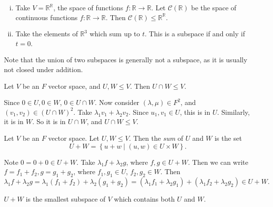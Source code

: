 \documentclass[12pt]{article}
\begin{document}
\begin{exbox}
	\begin{enumerate}[(i)]
		\item Take $V = \mathbb{R}^{\mathbb{R}}$, the space of functions $f : \mathbb{R} \to \mathbb{R}$. Let $\mathcal{C}(\mathbb{R})$ be the space of continuous functions $f : \mathbb{R} \to \mathbb{R}$. Then $\mathcal{C}(\mathbb{R}) \leq \mathbb{R}^{\mathbb{R}}$.
		\item Take the elements of $\mathbb{R}^3$ which sum up to $t$. This is a subspace if and only if $t = 0$.
	\end{enumerate}	
\end{exbox}

Note that the union of two subspaces is generally not a subspace, as it is usually not closed under addition.

\begin{proposition}
	Let $V$ be an $F$ vector space, and $U, W \leq V$. Then $U \cap W \leq V$.
\end{proposition}

\begin{proofbox}
	Since $0 \in U, 0 \in W$, $0 \in U \cap W$. Now consider $(\lambda, \mu) \in F^2$, and $(v_1, v_2) \in (U \cap W)^2$. Take $\lambda_1 v_1 + \lambda_2 v_2$. Since $u_1,v_1 \in U$, this is in $U$. Similarly, it is in $W$. So it is in $U \cap W$, and $U \cap W \leq V$.
\end{proofbox}

\begin{definition}
	Let $V$ be an $F$ vector space. Let $U, W \leq V$. Then the \textit{sum} of $U$ and $W$ is the set
	\[
		U + W = \left\{ u + w \mid (u, w) \in U \times W \right\}
	.\]
\end{definition}

\begin{proofbox}
	Note $0 = 0 + 0 \in U + W$. Take $\lambda_1 f + \lambda_2 g$, where $f, g \in U + W$. Then we can write $f = f_1 + f_2, g = g_1 + g_2$, where $f_1, g_1 \in U$, $f_2, g_2 \in W$. Then 
\[
	\lambda_1 f + \lambda_2 g = \lambda_1 (f_1 + f_2) + \lambda_2(g_1 + g_2) = (\lambda_1 f_1 + \lambda_2 g_1) + (\lambda_1 f_2 + \lambda_2 g_2) \in U + W
.\]
\end{proofbox}

\begin{remark}
	$U + W$ is the smallest subspace of $V$ which contains both $U$ and $W$.
\end{remark}
\end{document}

